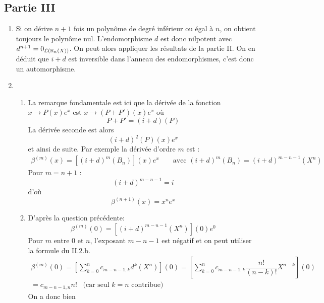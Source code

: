 \subsection*{Partie III}
\begin{enumerate}
 \item Si on dérive $n+1$ fois un polynôme de degré inférieur ou égal à $n$, on obtient toujours le polynôme nul. L'endomorphisme $d$ est donc nilpotent avec $d^{n+1}=0_{\mathcal L(\mathbb{R}_n(X))}$. On peut alors appliquer les résultats de la partie II. On en déduit que $i+d$ est inversible dans l'anneau des endomorphismes, c'est donc un automorphisme.
\item \begin{enumerate}
 \item La remarque fondamentale est ici que la dérivée de la fonction $x\rightarrow P(x)e^x$ est $x\rightarrow (P + P')(x)e^x$ où
\begin{displaymath}
 P + P' =(i+d)(P)
\end{displaymath}
La dérivée seconde est alors
\begin{displaymath}
 (i+d)^2(P)(x)e^x
\end{displaymath}
et ainsi de suite. Par exemple la dérivée d'ordre $m$ est :
\begin{align*}
 \beta^{(m)}(x) =
\left[ (i+d)^m(B_n)\right](x)e^x 
& & \text{ avec }
 (i+d)^m(B_n) = (i+d)^{m-n-1}(X^n)
\end{align*}
Pour $m=n+1$ :
\begin{displaymath}
 (i+d)^{m-n-1} = i
\end{displaymath}
d'où
\begin{displaymath}
 \beta^{(n+1)}(x) = x^ne^x
\end{displaymath}
\item D'après la question précédente:
\begin{displaymath}
 \beta^{(m)}(0) =\left[ (i+d)^{m-n-1}(X^n)\right](0)e^{0} 
\end{displaymath}
Pour $m$ entre $0$ et $n$, l'exposant $m-n-1$ est négatif et on peut utiliser la formule du II.2.b.
\begin{multline*}
 \beta^{(m)}(0) =
\left[
\sum_{k=0}^n c_{m-n-1,k}d^k(X^n)
\right] (0)
= \left[
\sum_{k=0}^n c_{m-n-1,k}\dfrac{n!}{(n-k)!}X^{n-k}
\right] (0)\\
=c_{m-n-1,n}n! \hspace{10pt}\text{(car seul $k=n$ contribue)}
\end{multline*}
On a donc bien
\begin{displaymath}

\end{displaymath}
\end{enumerate}
\end{enumerate}

